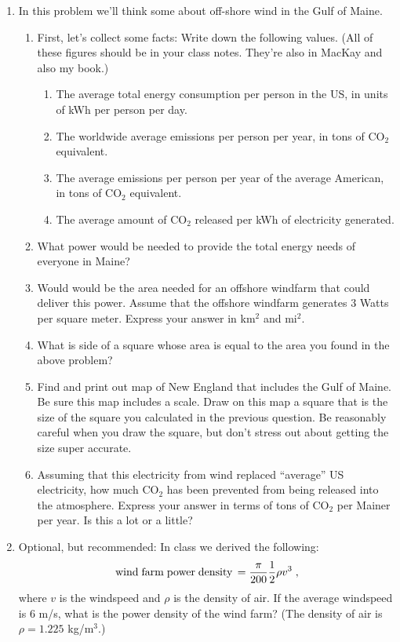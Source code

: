 \documentclass[11pt]{article}
\begin{document}
\begin{enumerate}
\item In this problem we'll think some about off-shore wind in the
  Gulf of Maine.
\begin{enumerate}
  \item First, let's collect some facts:  Write down the following
    values.  (All of these figures should be in your class notes.
    They're also in MacKay and also my book.)
\begin{enumerate}
    \item The average total energy consumption per person in the US,
      in units of kWh per person per day.
    \item The worldwide average emissions per person per year, in tons
      of CO$_2$ equivalent. 
    \item The average emissions per person per year of the average
      American, in tons of CO$_2$ equivalent.
    \item The average amount of CO$_2$ released per kWh of electricity 
      generated. 
\end{enumerate}

\item What power would be needed to provide the total energy needs of
  everyone in Maine? 

\item Would would be the area needed for an offshore windfarm that
  could deliver this power.  Assume that the offshore windfarm
  generates $3$ Watts per square meter.  Express your answer in km$^2$
  and mi$^2$.

\item What is side of a square whose area is equal to the area you
  found in the above problem?

\item Find and print out map of New England that includes the Gulf of
  Maine.  Be sure this map includes a scale.  Draw on this map a
  square that is the size of the square you calculated in the previous
  question.  Be reasonably careful when you draw the square, but don't
  stress out about getting the size super accurate.  

\item Assuming that this electricity from wind replaced ``average''
  US electricity, how much CO$_2$ has been prevented from being
  released into the atmosphere.  Express your answer in terms of tons
  of CO$_2$ per Mainer per year. Is this a lot or a little? 

\end{enumerate}


\item Optional, but recommended: In class we derived the following:
\begin{equation}
 {\rm wind\;farm\;power\;density} \, = \frac{\pi}{200}\frac{1}{2} \rho
 v^3 \;,
\end{equation}
where $v$ is the windspeed and $\rho$ is the density of air.  If the
average windspeed is $6$ m/s, what is the power density of the wind
farm?  (The density of air is $\rho = 1.225$ kg/m$^3$.)

\end{enumerate}
\end{document}

